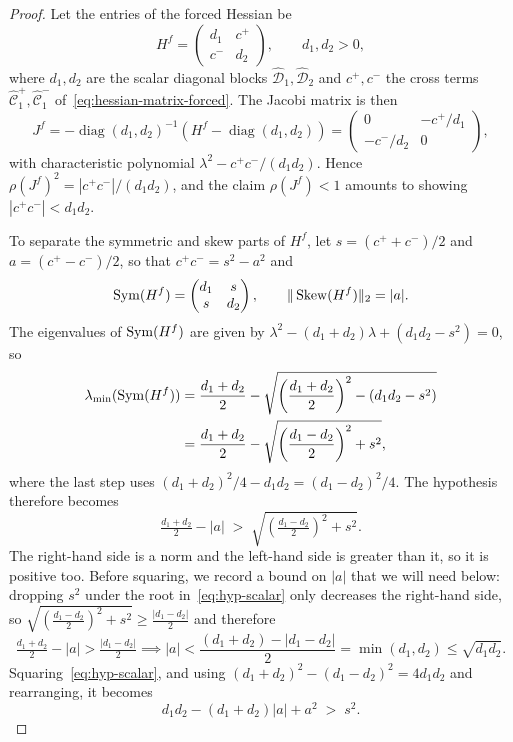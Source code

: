 \begin{proof}
	Let the entries of the forced Hessian be
	\[
		H^f = \begin{pmatrix} d_1 & c^+ \\ c^- & d_2 \end{pmatrix},
		\qquad d_1, d_2 > 0,
	\]
	where $d_1, d_2$ are the scalar diagonal blocks $\hat{\mathcal{D}}_1, \hat{\mathcal{D}}_2$ and $c^+, c^-$ the cross terms $\hat{\mathcal{C}}^+_1, \hat{\mathcal{C}}^-_1$ of~\eqref{eq:hessian-matrix-forced}. The Jacobi matrix is then
	\[
		J^f = -\operatorname{diag}(d_1, d_2)^{-1}\left(H^f - \operatorname{diag}(d_1, d_2)\right)
		= \begin{pmatrix} 0 & -c^+/d_1 \\ -c^-/d_2 & 0 \end{pmatrix},
	\]
	with characteristic polynomial $\lambda^2 - c^+ c^- / (d_1 d_2)$. Hence $\rho(J^f)^2 = |c^+ c^-| / (d_1 d_2)$, and the claim $\rho(J^f) < 1$ amounts to showing $|c^+ c^-| < d_1 d_2$.

	To separate the symmetric and skew parts of $H^f$, let $s = (c^+ + c^-)/2$ and $a = (c^+ - c^-)/2$, so that $c^+ c^- = s^2 - a^2$ and
	\[
		\operatorname{Sym}(H^f) = \begin{pmatrix} d_1 & s \\ s & d_2 \end{pmatrix},
		\qquad
		\|\operatorname{Skew}(H^f)\|_2 = |a|.
	\]
	The eigenvalues of $\operatorname{Sym}(H^f)$ are given by $\lambda^2 - (d_1+d_2)\lambda + (d_1 d_2 - s^2) = 0$, so
	\begin{align*}
		\lambda_{\min}(\operatorname{Sym}(H^f))
		&= \frac{d_1+d_2}{2} - \sqrt{\left(\frac{d_1+d_2}{2}\right)^2 - (d_1 d_2 - s^2)} \\
		&= \frac{d_1+d_2}{2} - \sqrt{\left(\frac{d_1-d_2}{2}\right)^2 + s^2},
	\end{align*}
	where the last step uses $(d_1+d_2)^2/4 - d_1 d_2 = (d_1-d_2)^2/4$. The hypothesis therefore becomes
	\begin{equation}
		\tfrac{d_1 + d_2}{2} - |a| \;>\; \sqrt{\left(\tfrac{d_1 - d_2}{2}\right)^2 + s^2}.
		\label{eq:hyp-scalar}
	\end{equation}
	The right-hand side is a norm and the left-hand side is greater than it, so it is positive too. Before squaring, we record a bound on $|a|$ that we will need below: dropping $s^2$ under the root in~\eqref{eq:hyp-scalar} only decreases the right-hand side, so $\sqrt{\left(\tfrac{d_1-d_2}{2}\right)^2 + s^2} \geq \tfrac{|d_1-d_2|}{2}$ and therefore
	\begin{equation}
		\tfrac{d_1 + d_2}{2} - |a| > \tfrac{|d_1 - d_2|}{2}
		\implies
		|a| < \frac{(d_1 + d_2) - |d_1 - d_2|}{2} = \min(d_1, d_2) \leq \sqrt{d_1 d_2}.
		\label{eq:hyp-scalar-amin}
	\end{equation}
	Squaring~\eqref{eq:hyp-scalar}, and using $(d_1+d_2)^2 - (d_1-d_2)^2 = 4 d_1 d_2$ and rearranging, it becomes
	\begin{equation}
		d_1 d_2 - (d_1 + d_2)|a| + a^2 \;>\; s^2.
		\label{eq:hyp-scalar-simplified}
	\end{equation}


\end{proof}
